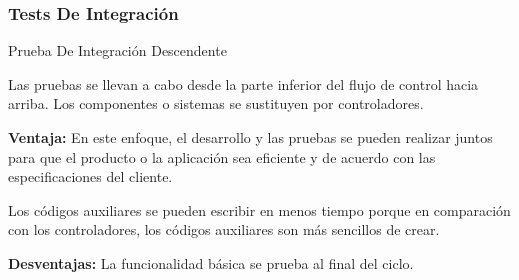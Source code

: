 \begin{frame}
    \frametitle{Tests De Integración}

    \begin{block}{Prueba De Integración Descendente}

        Las pruebas se llevan a cabo desde la parte inferior del flujo de
        control hacia arriba. Los componentes o sistemas se sustituyen 
        por controladores.
        
        \textbf{Ventaja:} En este enfoque, el desarrollo y las pruebas 
        se pueden realizar juntos para que el producto o la aplicación 
        sea eficiente y de acuerdo con las especificaciones del cliente.
        
        Los códigos auxiliares se pueden escribir en menos tiempo porque
        en comparación con los controladores, los códigos auxiliares son 
        más sencillos de crear.
        
        \textbf{Desventajas:} La funcionalidad básica se prueba al final 
        del ciclo.
    \end{block}
\end{frame}

